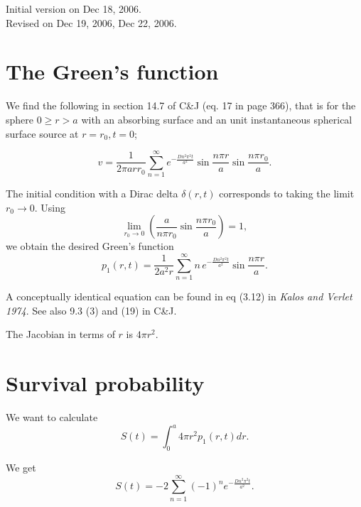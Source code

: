 \documentclass{article}
\begin{document}
\maketitle
\begin{center}
Initial version on Dec 18, 2006.\\
Revised on Dec 19, 2006, Dec 22, 2006.
\end{center}

\section{The Green's function}

We find the following in section 14.7 of C\&J (eq. 17 in page 366),
that is for the sphere $0 \geq r > a$ with an absorbing surface
and an unit instantaneous spherical surface source at $r = r_0, t = 0$;

\begin{equation}
v = \frac{1}{2 \pi a r r_0} \sum_{n=1}^{\infty} e^{- \frac{D n^2 \pi^2 t}{a^2} }
\sin \frac{n \pi r}{a} \sin \frac{n \pi r_0}{a}.
\end{equation}

The initial condition with a Dirac delta $\delta(r,t)$ corresponds
to taking the limit $r_0 \rightarrow 0$.  Using
\begin{equation}
\lim_{r_0 \rightarrow 0} 
\left( \frac{a}{n \pi r_0} \sin \frac{n \pi r_0}{a}\right) = 1,
\end{equation}
we obtain the desired Green's function
\begin{equation}
p_1(r,t) = 
\frac{1}{2 a^2 r} \sum_{n=1}^{\infty} n \, e^{- \frac{D n^2 \pi^2 t}{a^2} }
\sin \frac{n \pi r}{a}.
\end{equation}

A conceptually identical equation can be found in eq (3.12) in
{\it Kalos and Verlet 1974}.    See also 9.3 (3) and (19) in C\&J.

The Jacobian in terms of $r$ is $4 \pi r^2$.

\section{Survival probability}

We want to calculate
\begin{equation}
S(t) = \int_{0}^{a} 4 \pi r^2 p_1(r,t) dr.
\end{equation}

We get
\begin{equation}
S(t) = -2 \sum_{n=1}^{\infty} (-1)^n e^{- \frac{D n^2 \pi^2 t}{a^2}}.
\end{equation}
\end{document}
